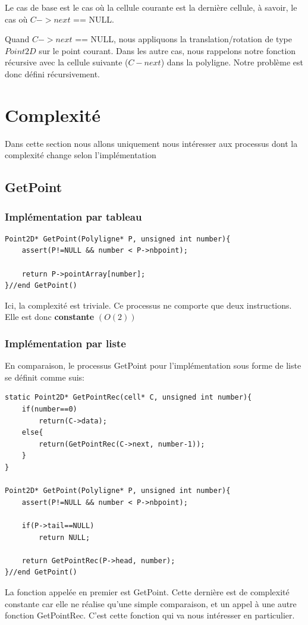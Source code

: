 \documentclass[a4paper, 11pt, oneside]{article}
\begin{document}
Le cas de base est le cas où la cellule courante est la dernière cellule, à savoir, le cas où $C->next$ == NULL.

Quand $C->next$ == NULL, nous appliquons la translation/rotation de type $Point2D$ sur le point courant. Dans les autre cas, nous rappelons notre fonction récursive avec la cellule suivante ($C-next$) dans la polyligne. Notre problème est donc défini récursivement.


\section{Complexité}
Dans cette section nous allons uniquement nous intéresser aux processus dont la complexité change selon l'implémentation
\subsection{GetPoint}
\subsubsection{Implémentation par tableau}

\begin{lstlisting}
Point2D* GetPoint(Polyligne* P, unsigned int number){
    assert(P!=NULL && number < P->nbpoint);

    return P->pointArray[number];
}//end GetPoint()
\end{lstlisting}
Ici, la complexité est triviale. Ce processus ne comporte que deux instructions. Elle est donc \textbf{constante} $(O(2))$ 



\subsubsection{Implémentation par liste}
En comparaison, le processus GetPoint pour l'implémentation sous forme de liste se définit comme suis: 

\begin{lstlisting}
static Point2D* GetPointRec(cell* C, unsigned int number){
    if(number==0)
        return(C->data);
    else{       
        return(GetPointRec(C->next, number-1));
    }
}

Point2D* GetPoint(Polyligne* P, unsigned int number){
    assert(P!=NULL && number < P->nbpoint);

    if(P->tail==NULL)
        return NULL;

    return GetPointRec(P->head, number);
}//end GetPoint()
\end{lstlisting}
La fonction appelée en premier est GetPoint. Cette dernière est de complexité constante car elle ne réalise qu’une simple comparaison, et un appel à une autre fonction GetPointRec. C’est cette fonction qui va  nous intéresser en particulier.
\end{document}
